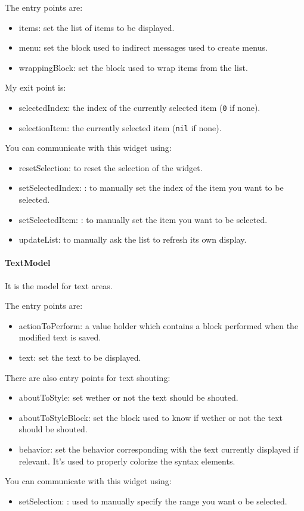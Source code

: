 \documentclass[a4paper,10pt,twoside]{book}
\begin{document}
The entry points are:
\begin{itemize}
	\item items: set the list of items to be displayed.
	\item menu: set the block used to indirect messages used to create menus.
	\item wrappingBlock: set the block used to wrap items from the list.
\end{itemize}
My exit point is:
\begin{itemize}
	\item selectedIndex: the index of the currently selected item (\verb+0+ if none).
	\item selectionItem: the currently selected item (\verb+nil+ if none).
\end{itemize}
You can communicate with this widget using:
\begin{itemize}
\item resetSelection: to reset the selection of the widget.
\item setSelectedIndex: : to manually set the index of the item you want to be selected.
\item setSelectedItem: : to manually set the item you want to be selected. 
\item updateList: to manually ask the list to refresh its own display.
\end{itemize}


\paragraph{TextModel} It is the model for text areas.

The entry points are:
\begin{itemize}
	\item actionToPerform: a value holder which contains a block performed when the modified text is saved.
	\item text: set the text to be displayed.
\end{itemize}
There are also entry points for text shouting:
\begin{itemize}	
	\item aboutToStyle: set wether or not the text should be shouted.
	\item aboutToStyleBlock: set the block used to know if wether or not the text should be shouted.
	\item behavior: set the behavior corresponding with the text currently displayed if relevant. It's used to properly colorize the syntax elements.
\end{itemize}	
You can communicate with this widget using:
\begin{itemize}	
	\item setSelection: : used to manually specify the range you want o be selected.
\end{itemize}
\end{document}
